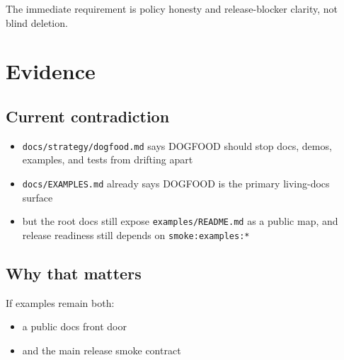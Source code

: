The immediate requirement is policy honesty and release-blocker clarity, not blind deletion.

\section{Evidence}\label{record-086-evidence}

\subsection{Current contradiction}\label{record-086-current-contradiction}

\begin{itemize}
\tightlist
\item
  \texttt{d\allowbreak{}o\allowbreak{}c\allowbreak{}s\allowbreak{}/\allowbreak{}s\allowbreak{}t\allowbreak{}r\allowbreak{}a\allowbreak{}t\allowbreak{}e\allowbreak{}g\allowbreak{}y\allowbreak{}/\allowbreak{}d\allowbreak{}o\allowbreak{}g\allowbreak{}f\allowbreak{}o\allowbreak{}o\allowbreak{}d\allowbreak{}.\allowbreak{}m\allowbreak{}d} says DOGFOOD should stop docs, demos, examples, and tests from drifting apart
\item
  \texttt{d\allowbreak{}o\allowbreak{}c\allowbreak{}s\allowbreak{}/\allowbreak{}E\allowbreak{}X\allowbreak{}A\allowbreak{}M\allowbreak{}P\allowbreak{}L\allowbreak{}E\allowbreak{}S\allowbreak{}.\allowbreak{}m\allowbreak{}d} already says DOGFOOD is the primary living-docs surface
\item
  but the root docs still expose \texttt{e\allowbreak{}x\allowbreak{}a\allowbreak{}m\allowbreak{}p\allowbreak{}l\allowbreak{}e\allowbreak{}s\allowbreak{}/\allowbreak{}R\allowbreak{}E\allowbreak{}A\allowbreak{}D\allowbreak{}M\allowbreak{}E\allowbreak{}.\allowbreak{}m\allowbreak{}d} as a public map, and release readiness still depends on \texttt{s\allowbreak{}m\allowbreak{}o\allowbreak{}k\allowbreak{}e\allowbreak{}:\allowbreak{}e\allowbreak{}x\allowbreak{}a\allowbreak{}m\allowbreak{}p\allowbreak{}l\allowbreak{}e\allowbreak{}s\allowbreak{}:\allowbreak{}*}
\end{itemize}

\subsection{Why that matters}\label{record-086-why-that-matters}

If examples remain both:

\begin{itemize}
\tightlist
\item
  a public docs front door
\item
  and the main release smoke contract
\end{itemize}

